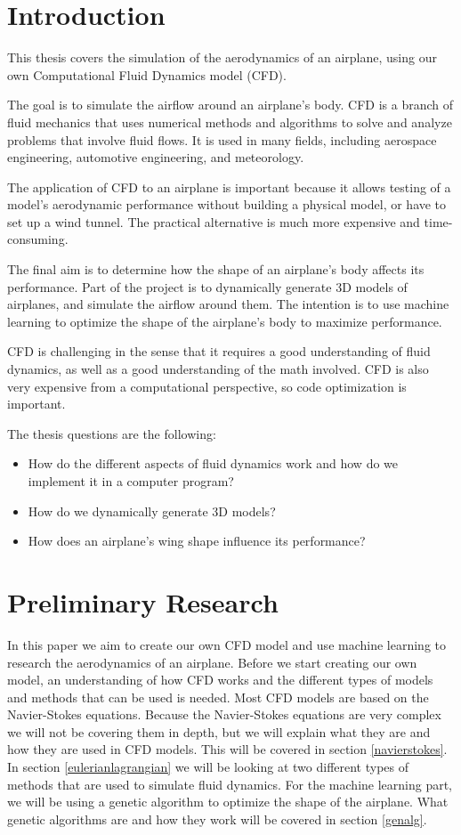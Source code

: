 \documentclass[a4paper,12pt,titlepage]{article}
\begin{document}
\section{Introduction}
This thesis covers the simulation of the aerodynamics of an airplane, using
our own Computational Fluid Dynamics model (CFD).

The goal is to simulate the airflow around an airplane's body. CFD is a
branch of fluid mechanics that uses numerical methods and algorithms to solve
and analyze problems that involve fluid flows. It is used in many fields,
including aerospace engineering, automotive engineering, and meteorology.

The application of CFD to an airplane is important because it allows testing
of a model's aerodynamic performance without building a physical model, or
have to set up a wind tunnel. The practical alternative is much more expensive
and time-consuming.

The final aim is to determine how the shape of an airplane's body affects its
performance. Part of the project is to dynamically generate 3D models of
airplanes, and simulate the airflow around them. The intention is to use
machine learning to optimize the shape of the airplane's body to maximize
performance.

CFD is challenging in the sense that it requires a good understanding of fluid
dynamics, as well as a good understanding of the math involved. CFD is also
very expensive from a computational perspective, so code optimization is important.

The thesis questions are the following:
\begin{itemize}
	\item{How do the different aspects of fluid dynamics work and how do we
		implement it in a computer program?}
	\item{How do we dynamically generate 3D models?}
	\item{How does an airplane's wing shape influence its performance?}
\end{itemize}
\pagebreak

\section{Preliminary Research}
In this paper we aim to create our own CFD model and use machine learning to research the aerodynamics of an airplane.
Before we start creating our own model, an understanding of how CFD works 
and the different types of models and methods that can be used is needed.
Most CFD models are based on the Navier-Stokes equations. Because the Navier-Stokes equations are very complex we will not be covering them in depth, 
but we will explain what they are and how they are used in CFD models.
This will be covered in section \ref{navierstokes}.
In section \ref{eulerianlagrangian} we will be looking at two different types of methods that are used to simulate fluid dynamics.
For the machine learning part, we will be using a genetic algorithm to optimize the shape of the airplane. 
What genetic algorithms are and how they work will be covered in section \ref{genalg}.
\end{document}
